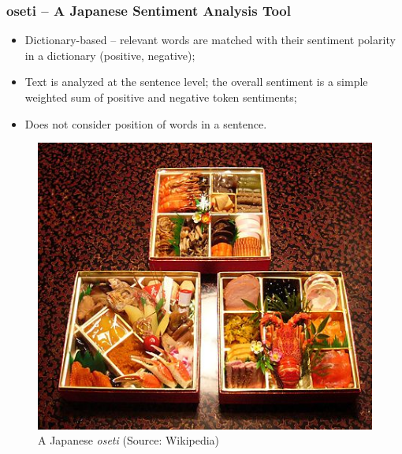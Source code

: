 \documentclass[11pt]{beamer}
\begin{document}
	\begin{frame}
		\frametitle{oseti -- A Japanese Sentiment Analysis Tool}
		\begin{itemize}
			\item Dictionary-based -- relevant words are matched with their sentiment polarity in a dictionary (positive, negative);
			\pause
			\item Text is analyzed at the sentence level; the overall sentiment is a simple weighted sum of positive and negative token sentiments;
			\pause
			\item Does not consider position of words in a sentence.
		\end{itemize}
		\pause
		\begin{figure}
			\begin{center}
				\includegraphics[scale=0.25]{oseti}
			\end{center}
			\caption{A Japanese \textit{oseti} (Source: Wikipedia)}
		\end{figure}
	\end{frame}
	
\end{document}
